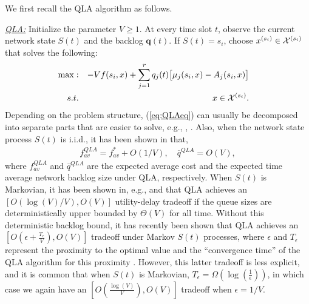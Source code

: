 \documentclass[journal]{IEEEtran}
\newcommand{\bv}[1]{{\boldsymbol{#1} }}
\newcommand{\script}[1]{{{\cal{#1} }}}
\begin{document}
We first recall the QLA algorithm \cite{neelynowbook} as follows. 

\underline{\emph{QLA:}} Initialize the parameter $V\geq1$. At every time slot $t$, observe the current network state $S(t)$ and the backlog $\bv{q}(t)$. If $S(t)=s_i$, choose $x^{(s_i)}\in\script{X}^{(s_i)}$ that solves the following: 
\begin{eqnarray}
\hspace{-.3in}\max: && -Vf(s_i, x)+\sum_{j=1}^{r}q_j(t)\big[\mu_j(s_i, x)-A_j(s_i, x)\big]\label{eq:QLAeq}\\
s.t. && x\in\script{X}^{(s_i)}.\nonumber
\end{eqnarray}
Depending on the problem structure, (\ref{eq:QLAeq}) can usually be decomposed into separate parts that are easier to solve, e.g., \cite{neelyenergy}, \cite{huangneelypricing}. 
Also, when the network state process $S(t)$ is i.i.d., it has been shown in \cite{neelynowbook} that, 
\begin{eqnarray}
f_{av}^{QLA}=f^*_{av}+O(1/V),\quad \overline{q}^{QLA}=O(V),\label{eq:qla_performance}
\end{eqnarray}
where $f_{av}^{QLA}$ and $\overline{q}^{QLA}$ are the expected average cost and the expected time average network backlog size under QLA, respectively. 
When $S(t)$ is Markovian, it has been shown in, e.g., \cite{huangneelypricing} and \cite{rahulneelycognitive} that QLA achieves an $[O(\log(V)/V), O(V)]$ utility-delay tradeoff if the queue sizes are deterministically upper bounded by $\Theta(V)$ for all time. Without this deterministic backlog bound, it has recently been shown that QLA achieves an $[O(\epsilon+\frac{T_{\epsilon}}{V}), O(V)]$ tradeoff under Markov $S(t)$ processes, where $\epsilon$ and $T_{\epsilon}$ represent the proximity to the optimal value and the ``convergence time'' of the QLA algorithm for this proximity \cite{neely_queuestability10}. 
However, this latter tradeoff is less explicit, and it is common that when $S(t)$ is Markovian, $T_{\epsilon}=\Omega(\log(\frac{1}{\epsilon}))$, in which case we again have an $[O(\frac{\log(V)}{V}), O(V)]$ tradeoff when $\epsilon=1/V$. 
\end{document}
